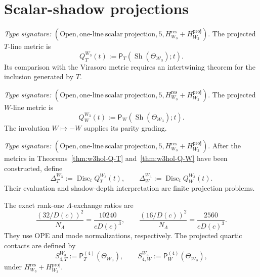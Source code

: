 \section{Scalar-shadow projections}
\label{sec:w3hol-shadow-connection}

\begin{theorem}
\label{thm:w3hol-Q-T}
\emph{Type signature:}
\((\mathrm{Open},\mathrm{one\text{-}line\ scalar\ projection},5,
H_{W_3}^{\mathrm{res}}+H_{W_3}^{\mathrm{proj}})\).
The projected \(T\)-line metric is
\begin{equation}\label{eq:w3hol-Q-T}
Q_T^{W_3}(t)
:=
\mathsf P_T\!\left(
\operatorname{Sh}(\Theta_{\mathcal W_3});t
\right).
\end{equation}
Its comparison with the Virasoro metric requires an intertwining
theorem for the inclusion generated by \(T\).
\end{theorem}

\begin{theorem}
\label{thm:w3hol-Q-W}
\emph{Type signature:}
\((\mathrm{Open},\mathrm{one\text{-}line\ scalar\ projection},5,
H_{W_3}^{\mathrm{res}}+H_{W_3}^{\mathrm{proj}})\).
The projected \(W\)-line metric is
\begin{equation}\label{eq:w3hol-Q-W}
Q_W^{W_3}(t)
:=
\mathsf P_W\!\left(
\operatorname{Sh}(\Theta_{\mathcal W_3});t
\right).
\end{equation}
The involution \(W\mapsto-W\) supplies its parity grading.
\end{theorem}

\begin{theorem}
\label{thm:w3hol-discriminants}
\emph{Type signature:}
\((\mathrm{Open},\mathrm{one\text{-}line\ scalar\ projection},5,
H_{W_3}^{\mathrm{res}}+H_{W_3}^{\mathrm{proj}})\).
After the metrics in
Theorems~\ref{thm:w3hol-Q-T} and~\ref{thm:w3hol-Q-W} have been
constructed, define
\begin{equation}\label{eq:w3hol-discriminants}
\Delta_T^{W_3}:=\operatorname{Disc}_t Q_T^{W_3}(t),
\qquad
\Delta_W^{W_3}:=\operatorname{Disc}_t Q_W^{W_3}(t).
\end{equation}
Their evaluation and shadow-depth interpretation are finite
projection problems.
\end{theorem}

\begin{remark}
\label{rem:w3hol-S4}
The exact rank-one \(\Lambda\)-exchange ratios are
\[
\frac{(32/D(c))^2}{N_\Lambda}
=\frac{10240}{cD(c)^3},
\qquad
\frac{(16/D(c))^2}{N_\Lambda}
=\frac{2560}{cD(c)^3}.
\]
They use OPE and mode normalizations, respectively.  The projected
quartic contacts are defined by
\begin{equation}\label{eq:w3hol-S4}
S_{4,T}^{W_3}:=\mathsf P_T^{(4)}(\Theta_{\mathcal W_3}),
\qquad
S_{4,W}^{W_3}:=\mathsf P_W^{(4)}(\Theta_{\mathcal W_3}),
\end{equation}
under \(H_{W_3}^{\mathrm{res}}+H_{W_3}^{\mathrm{proj}}\).
\end{remark}

